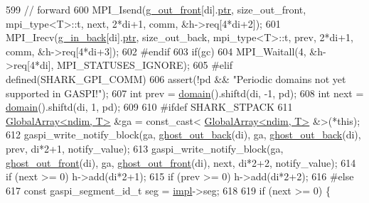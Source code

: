 \begin{DoxyCode}
599                 \textcolor{comment}{// forward}
600                 MPI\_Isend(\hyperlink{classshark_1_1ndim_1_1_global_array_ad811cd36846992d5671148e7da49bb04}{g\_out\_front}[di].\hyperlink{classshark_1_1ndim_1_1_global_array_ad4af3b8307a3a7107186cf699b5a2432}{ptr}, size\_out\_front, mpi\_type<T>::t, next, 2*di+1, 
      comm, &h->req[4*di+2]);
601                 MPI\_Irecv(\hyperlink{classshark_1_1ndim_1_1_global_array_a148e8382e63e8ff0c9fece28f1131702}{g\_in\_back}[di].\hyperlink{classshark_1_1ndim_1_1_global_array_ad4af3b8307a3a7107186cf699b5a2432}{ptr}, size\_out\_back, mpi\_type<T>::t, prev, 2*di+1, comm,
       &h->req[4*di+3]);
602 \textcolor{preprocessor}{#endif}
603                 \textcolor{keywordflow}{if}(gc)
604                         MPI\_Waitall(4, &h->req[4*di], MPI\_STATUSES\_IGNORE);
605 \textcolor{preprocessor}{#elif defined(SHARK\_GPI\_COMM)}
606                 assert(!pd && \textcolor{stringliteral}{"Periodic domains not yet supported in GASPI!"});
607                 \textcolor{keywordtype}{int} prev = \hyperlink{classshark_1_1ndim_1_1_global_array_a435ee8ff23c3feadf2ef2be64d4f375c}{domain}().shiftd(di, -1, pd);
608                 \textcolor{keywordtype}{int} next = \hyperlink{classshark_1_1ndim_1_1_global_array_a435ee8ff23c3feadf2ef2be64d4f375c}{domain}().shiftd(di,  1, pd);
609 
610 \textcolor{preprocessor}{#ifdef SHARK\_STPACK}
611                 \hyperlink{classshark_1_1ndim_1_1_global_array}{GlobalArray<ndim, T>} &ga = \textcolor{keyword}{const\_cast<}
      \hyperlink{classshark_1_1ndim_1_1_global_array}{GlobalArray<ndim, T>} &\textcolor{keyword}{>}(*this);
612                 gaspi\_write\_notify\_block(ga, \hyperlink{classshark_1_1ndim_1_1_global_array_ae4618013580af820c76c7e48d6de874a}{ghost\_out\_back}(di), ga, 
      \hyperlink{classshark_1_1ndim_1_1_global_array_ae4618013580af820c76c7e48d6de874a}{ghost\_out\_back}(di), prev, di*2+1, notify\_value);
613                 gaspi\_write\_notify\_block(ga, \hyperlink{classshark_1_1ndim_1_1_global_array_ad004cd3a0deeaee55d7f3590063d5a20}{ghost\_out\_front}(di), ga, 
      \hyperlink{classshark_1_1ndim_1_1_global_array_ad004cd3a0deeaee55d7f3590063d5a20}{ghost\_out\_front}(di), next, di*2+2, notify\_value);
614                 \textcolor{keywordflow}{if} (next >= 0) h->add(di*2+1);
615                 \textcolor{keywordflow}{if} (prev >= 0) h->add(di*2+2);
616 \textcolor{preprocessor}{#else}
617                 \textcolor{keyword}{const} gaspi\_segment\_id\_t seg = \hyperlink{classshark_1_1ndim_1_1_global_array_a70684121da4badfef791c15d7076282f}{impl}->seg;
618 
619                 \textcolor{keywordflow}{if} (next >= 0) \{

\end{DoxyCode}
